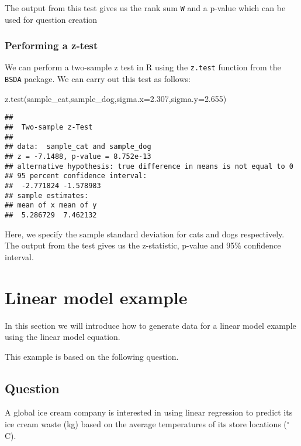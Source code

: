\documentclass[
]{book}
\newenvironment{Shaded}{\begin{snugshade}}{\end{snugshade}}
\newcommand{\AttributeTok}[1]{\textcolor[rgb]{0.77,0.63,0.00}{#1}}
\newcommand{\FloatTok}[1]{\textcolor[rgb]{0.00,0.00,0.81}{#1}}
\newcommand{\FunctionTok}[1]{\textcolor[rgb]{0.00,0.00,0.00}{#1}}
\newcommand{\NormalTok}[1]{#1}
\begin{document}
The output from this test gives us the rank sum \texttt{W} and a p-value which can be used for question creation

\hypertarget{performing-a-z-test}{%
\subsection{Performing a z-test}\label{performing-a-z-test}}

We can perform a two-sample z test in R using the \texttt{z.test} function from the \texttt{BSDA} package. We can carry out this test as follows:

\begin{Shaded}
\begin{Highlighting}[]
\FunctionTok{z.test}\NormalTok{(sample\_cat,sample\_dog,}\AttributeTok{sigma.x=}\FloatTok{2.307}\NormalTok{,}\AttributeTok{sigma.y=}\FloatTok{2.655}\NormalTok{)}
\end{Highlighting}
\end{Shaded}

\begin{verbatim}
## 
##  Two-sample z-Test
## 
## data:  sample_cat and sample_dog
## z = -7.1488, p-value = 8.752e-13
## alternative hypothesis: true difference in means is not equal to 0
## 95 percent confidence interval:
##  -2.771824 -1.578983
## sample estimates:
## mean of x mean of y 
##  5.286729  7.462132
\end{verbatim}

Here, we specify the sample standard deviation for cats and dogs respectively. The output from the test gives us the z-statistic, p-value and 95\% confidence interval.

\hypertarget{linear-model-example}{%
\chapter{Linear model example}\label{linear-model-example}}

In this section we will introduce how to generate data for a linear model example using the linear model equation.

This example is based on the following question.

\hypertarget{question}{%
\section{Question}\label{question}}

A global ice cream company is interested in using linear regression to predict its ice cream waste (kg) based on the average temperatures of its store locations (\(^{\circ}\)C).
\end{document}
